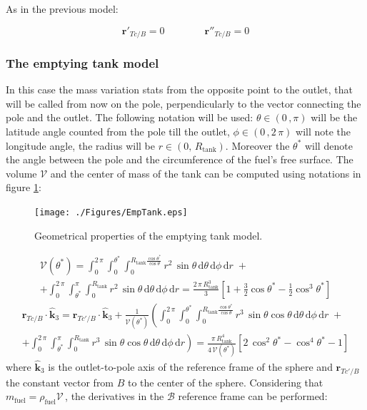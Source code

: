As in the previous model:

\begin{equation}
	\bm{r}'_{Tc/B} = 0 \qquad\qquad \bm{r}''_{Tc/B}=0
\end{equation}

\subsubsection{The emptying tank model}
In this case the mass variation stats from the opposite point to the outlet, that will be called from now on the pole, perpendicularly to the vector connecting the pole and the outlet.\newline
The following notation will be used: $\theta \in (0\,, \pi)$ will be the latitude angle counted from the pole till the outlet,  $\phi \in (0\,,2\,\pi)$ will note the longitude angle, the radius will be $r \in (0,\,R_{\text{tank}})$. Moreover the $\theta^*$ will denote the angle between the pole and the circumference of the fuel's free surface. The volume $\mathcal{V}$ and the center of mass of the tank can be computed using notations in figure \ref{fig:EmpTank}:

\begin{figure}[hb!]
	\centering
	\texttt{[image: ./Figures/EmpTank.eps]}
	\caption{Geometrical properties of the emptying tank model.}
	\label{fig:EmpTank}
\end{figure}


\begin{multline}
	\mathcal{V}(\theta^*)=\int_{0}^{2\,\pi}\int_{0}^{\theta^*}\int_{0}^{R_{\text{tank}}\frac{\cos{\theta^*}}{\cos{\theta}}}r^2\,\sin{\theta\,\text{d}\theta}\,\text{d}\phi\,\text{d}r\;+\\
	+\int_{0}^{2\,\pi}\int_{\theta^*}^{\pi}\int_{0}^{R_{\text{tank}}}r^2\,\sin{\theta\,\text{d}\theta}\,\text{d}\phi\,\text{d}r= \frac{2\,\pi\,R_{\text{tank}}^3}{3}\left[1+\frac{3}{2}\cos{\theta^*}-\frac{1}{2}\cos^3{\theta^*}\right]
\end{multline}
\vspace{3pt}
\begin{multline}
	\bm{r}_{Tc/B}\cdot\bm{\hat{k}}_3 = \bm{r}_{Tc'/B}\cdot\bm{\hat{k}}_3 +  \frac{1}{\mathcal{V}(\theta^*)}\left(\int_{0}^{2\,\pi}\int_{0}^{\theta^*}\int_{0}^{R_{\text{tank}}\frac{\cos{\theta^*}}{\cos{\theta}}}r^3\,\sin{\theta}\cos{\theta}\,\text{d}\theta\,\text{d}\phi\,\text{d}r\;+\right.\\\left.+\int_{0}^{2\,\pi}\int_{\theta^*}^{\pi}\int_{0}^{R_{\text{tank}}}r^3\,\sin{\theta}\cos{\theta}\,\text{d}\theta\,\text{d}\phi\,\text{d}r\right)
	= \frac{\pi\,R_{\text{tank}}^4}
	{4\,\mathcal{V}(\theta^*)}\left[2\,\cos^2{\theta^*} - \cos^4{\theta^*}-1\right]
\end{multline}
\noindent
where $\bm{\hat{k}}_3$ is the outlet-to-pole axis of the reference frame of the sphere and $\bm{r}_{Tc'/B}$ the constant vector from $B$ to the center of the sphere.\newline
Considering that $m_{\text{fuel}}=\rho_{\text{fuel}}\mathcal{V}\,$, the derivatives in the $\mathcal{B}$ reference frame can be performed:

